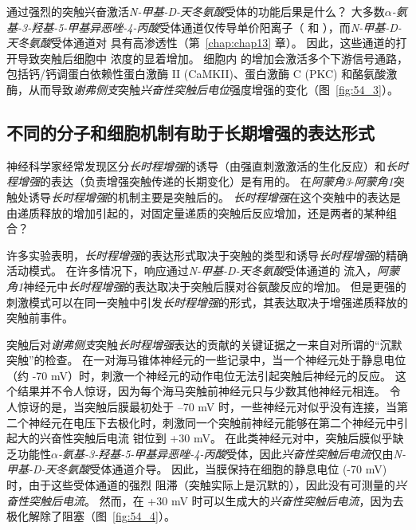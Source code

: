 通过强烈的突触兴奋激活\textit{N-甲基-D-天冬氨酸}受体的功能后果是什么？
大多数\textit{$\alpha$-氨基-3-羟基-5-甲基异恶唑-4-丙酸}受体通道仅传导单价阳离子（ 和 ），而\textit{N-甲基-D-天冬氨酸}受体通道对  具有高渗透性（第~\ref{chap:chap13} 章）。
因此，这些通道的打开导致突触后细胞中  浓度的显着增加。
细胞内  的增加会激活多个下游信号通路，包括钙/钙调蛋白依赖性蛋白激酶 II (CaMKII)、蛋白激酶 C (PKC) 和酪氨酸激酶，从而导致\textit{谢弗侧支}突触\textit{兴奋性突触后电位}强度增强的变化（图~\ref{fig:54_3}）。



\subsection{不同的分子和细胞机制有助于长期增强的表达形式}

神经科学家经常发现区分\textit{长时程增强}的诱导（由强直刺激激活的生化反应）和\textit{长时程增强}的表达（负责增强突触传递的长期变化）是有用的。
在\textit{阿蒙角3}-\textit{阿蒙角1}突触处诱导\textit{长时程增强}的机制主要是突触后的。
\textit{长时程增强}在这个突触中的表达是由递质释放的增加引起的，对固定量递质的突触后反应增加，还是两者的某种组合？


许多实验表明，\textit{长时程增强}的表达形式取决于突触的类型和诱导\textit{长时程增强}的精确活动模式。
在许多情况下，响应通过\textit{N-甲基-D-天冬氨酸}受体通道的  流入，\textit{阿蒙角1}神经元中\textit{长时程增强}的表达取决于突触后膜对谷氨酸反应的增加。
但是更强的刺激模式可以在同一突触中引发\textit{长时程增强}的形式，其表达取决于增强递质释放的突触前事件。


突触后对\textit{谢弗侧支}突触\textit{长时程增强}表达的贡献的关键证据之一来自对所谓的“沉默突触”的检查。
在一对海马锥体神经元的一些记录中，当一个神经元处于静息电位（约 -70 mV）时，刺激一个神经元的动作电位无法引起突触后神经元的反应。
这个结果并不令人惊讶，因为每个海马突触前神经元只与少数其他神经元相连。
令人惊讶的是，当突触后膜最初处于 –70 mV 时，一些神经元对似乎没有连接，当第二个神经元在电压下去极化时，刺激同一个突触前神经元能够在第二个神经元中引起大的兴奋性突触后电流 钳位到 +30 mV。
在此类神经元对中，突触后膜似乎缺乏功能性\textit{$\alpha$-氨基-3-羟基-5-甲基异恶唑-4-丙酸}受体，因此\textit{兴奋性突触后电流}仅由\textit{N-甲基-D-天冬氨酸}受体通道介导。
因此，当膜保持在细胞的静息电位 (-70 mV) 时，由于这些受体通道的强烈  阻滞（突触实际上是沉默的），因此没有可测量的\textit{兴奋性突触后电流}。
然而，在 +30 mV 时可以生成大的\textit{兴奋性突触后电流}，因为去极化解除了阻塞（图~\ref{fig:54_4}）。


